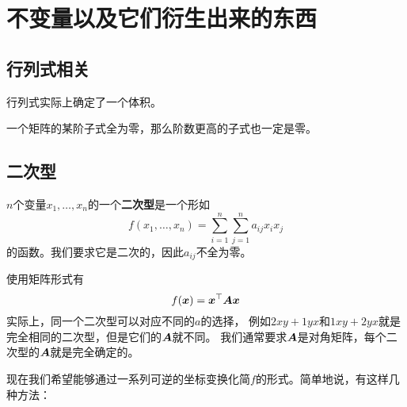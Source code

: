 \documentclass[UTF8]{ctexart}
\theoremstyle{definition}
\begin{document}
\section{不变量以及它们衍生出来的东西}

\subsection{行列式相关}

行列式实际上确定了一个体积。

一个矩阵的某阶子式全为零，那么阶数更高的子式也一定是零。

\subsection{二次型}

$n$个变量$x_1, \ldots, x_n$的一个\textbf{二次型}是一个形如
\[
f(x_1, \ldots, x_n) = \sum_{i=1}^n \sum_{j=1}^n a_{ij}x_i x_j 
\]
的函数。我们要求它是二次的，因此$a_{ij}$不全为零。

使用矩阵形式有
\[
f(\vb*{x}) = \vb*{x}^\top \vb*{A} \vb*{x}
\]
实际上，同一个二次型可以对应不同的$a$的选择，
例如$2xy+1yx$和$1xy+2yx$就是完全相同的二次型，但是它们的$\vb*{A}$就不同。
我们通常要求$\vb*{A}$是对角矩阵，每个二次型的$\vb*{A}$就是完全确定的。

现在我们希望能够通过一系列可逆的坐标变换化简$f$的形式。简单地说，有这样几种方法：
\end{document}
